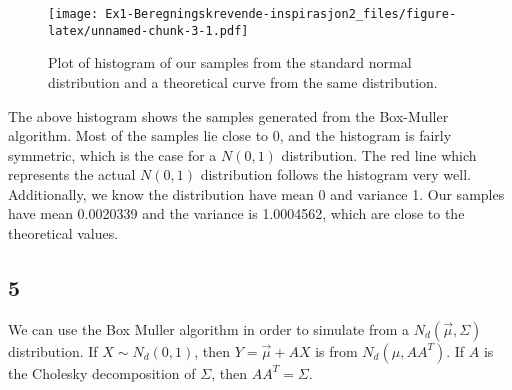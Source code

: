 \documentclass[
]{article}
\newenvironment{Shaded}{\begin{snugshade}}{\end{snugshade}}
\newcommand{\CommentTok}[1]{\textcolor[rgb]{0.56,0.35,0.01}{\textit{#1}}}
\newcommand{\ControlFlowTok}[1]{\textcolor[rgb]{0.13,0.29,0.53}{\textbf{#1}}}
\newcommand{\DataTypeTok}[1]{\textcolor[rgb]{0.13,0.29,0.53}{#1}}
\newcommand{\DecValTok}[1]{\textcolor[rgb]{0.00,0.00,0.81}{#1}}
\newcommand{\KeywordTok}[1]{\textcolor[rgb]{0.13,0.29,0.53}{\textbf{#1}}}
\newcommand{\NormalTok}[1]{#1}
\newcommand{\OperatorTok}[1]{\textcolor[rgb]{0.81,0.36,0.00}{\textbf{#1}}}
\newcommand{\StringTok}[1]{\textcolor[rgb]{0.31,0.60,0.02}{#1}}
\begin{document}
\begin{figure}
\centering
\texttt{[image: Ex1-Beregningskrevende-inspirasjon2\_files/figure-latex/unnamed-chunk-3-1.pdf]}
\caption{Plot of histogram of our samples from the standard normal
distribution and a theoretical curve from the same distribution.}
\end{figure}

The above histogram shows the samples generated from the Box-Muller
algorithm. Most of the samples lie close to 0, and the histogram is
fairly symmetric, which is the case for a \(N(0,1)\) distribution. The
red line which represents the actual \(N(0,1)\) distribution follows the
histogram very well. Additionally, we know the distribution have mean 0
and variance 1. Our samples have mean 0.0020339 and the variance is
1.0004562, which are close to the theoretical values.

\hypertarget{section-2}{%
\subsection{5}\label{section-2}}

We can use the Box Muller algorithm in order to simulate from a
\(N_d(\vec\mu, \Sigma)\) distribution. If \(X\sim N_d(0,1)\), then
\(Y=\vec\mu+AX\) is from \(N_d(\mu,AA^T)\). If \(A\) is the Cholesky
decomposition of \(\Sigma\), then \(AA^T=\Sigma\).

\begin{Shaded}
\end{Shaded}
\end{document}
